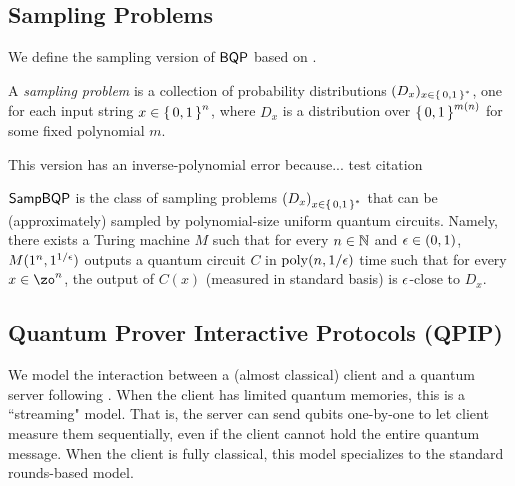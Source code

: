 \subsection{Sampling Problems}

We define the sampling version of $\operatorname{\mathsf{BQP}}$ based on \cite{aaronson_2013}.

\begin{definition} 
    \label{dfn:sampling-problem}
    A \emph{sampling problem} is a collection of probability distributions $(D_x)_{x\in\set{0, 1}^*}$, one for each input string $x\in\set{0,1}^n$, where $D_x$ is a distribution over $\set{0,1}^{m(n)}$ for some fixed polynomial $m$.
\end{definition}

This version has an inverse-polynomial error because... \cite{aaronson_arkhipov_2011}
test citation

\begin{definition} [$\SampBQP$]
    $\SampBQP$ is the class of sampling problems $\left(D_x\right)_{x\in\set{0, 1}^*}$ that can be (approximately) sampled by polynomial-size uniform quantum circuits. Namely, there exists a Turing machine $M$ such that for every $n \in \mathbb{N}$ and $\epsilon \in (0,1)$, $M(1^n, 1^{1/\epsilon})$ outputs a quantum circuit $C$ in $\operatorname*{\operatorname{poly}}(n, 1/\epsilon)$ time such that for every $x \in \zo^n$, the output of $C(x)$ (measured in standard basis) is $\epsilon$-close to $D_x$.
\end{definition}

\subsection{Quantum Prover Interactive Protocols (QPIP)}

We model the interaction between a (almost classical) client and a quantum server following \cite{FOCS:Mahadev18a}.
When the client has limited quantum memories, this is a ``streaming" model.
That is, the server can send qubits one-by-one to let client measure them sequentially,
even if the client cannot hold the entire quantum message.
When the client is fully classical,
this model specializes to the standard rounds-based model.

